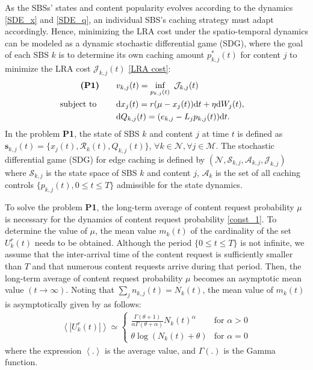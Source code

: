 \documentclass{book}
\begin{document}
    As the SBSs' states and content popularity evolves according to the dynamics \eqref{SDE_x} and \eqref{SDE_q}, an individual SBS's caching strategy must adapt accordingly. Hence, minimizing the LRA cost under the spatio-temporal dynamics can be modeled as a dynamic stochastic differential game (SDG), where the goal of each SBS $k$ is to determine its own caching amount ${p}_{k,j}^*(t)$ for content $j$  to minimize the LRA cost  $\mathcal{J}_{k,j}(t)$ \eqref{LRA cost}:
    \begin{align}
    \hspace{-1.3cm}\textbf{(P1)} \quad\quad&v_{k,j}(t)=\mathop{\text{inf}}\limits_{p_{k,j}(t)}\text{ } \mathcal{J}_{k,j}(t) \\
    \text{subject to }\quad\quad&\text{d}x_j(t)= r(\mu-x_j(t))\text{d}t+\eta \text{d}W_j(t), \quad\label{const_1} \\ 
    &\text{d}Q_{k,j}(t)=(e_{k,j}-L_j p_{k,j}(t))\text{d}t.   \label{const_2}
    \end{align} 
    In the problem \textbf{P1}, the state of SBS $k$ and content $j$ at time $t$ is defined as 
    $\boldsymbol{s}_{k,j}(t)=\{x_j(t),\mathcal{R}_k(t),Q_{k,j}(t)\}$, $\forall k \in \mathcal{N}, \forall j \in \mathcal{M}$. The stochastic differential game (SDG) for edge caching is defined by
    $(\mathcal{N},\mathcal{S}_{k,j}, \mathcal{A}_{k,j}, \mathcal{J}_{k,j}    )$ where $\mathcal{S}_{k,j}$ is the state space of SBS $k$ and content $j$, $\mathcal{A}_k$ is the set of all caching controls $\{p_{k,j}(t), 0 \leq t \leq T \}$ admissible for
    the state dynamics.
    
    
    To solve the problem \textbf{P1}, the long-term average of content request probability $\mu$ is necessary for the dynamics of content request probability \eqref{const_1}. 
    To determine the value of $\mu$, the mean value $m_k(t)$ of the cardinality of the set $U_k^r(t)$ needs to be obtained. 
    Although the period $\{0\leq t\leq T\}$ is not infinite, we assume that the inter-arrival time of the content request is sufficiently smaller than $T$ and that numerous content requests arrive during that period. Then, the long-term average of content request probability $\mu$ becomes an asymptotic mean value $(t\!\rightarrow\! \infty)$.
    Noting that $\sum_j n_{k,j}(t) = N_k(t)$, the mean value of $m_k(t)$ is asymptotically given by \cite{CRP_2} as follows:
    \begin{align}
    \left<|U^r_k(t)|\right>  \simeq \left\{ \begin{array}{ll}
     \frac{\Gamma(\theta+1)}{\alpha\Gamma(\theta+\alpha)}N_k(t)^{\alpha} & \textrm{for $\alpha>0$}\\
    \theta \log(N_k(t)+\theta) & \textrm{for $\alpha=0$}\end{array} \right.  \label{avg_Nk}
    \end{align}
    where the expression $\left<.\right>$ is the average value, and $\Gamma(.)$ is the Gamma function. 
\end{document}

